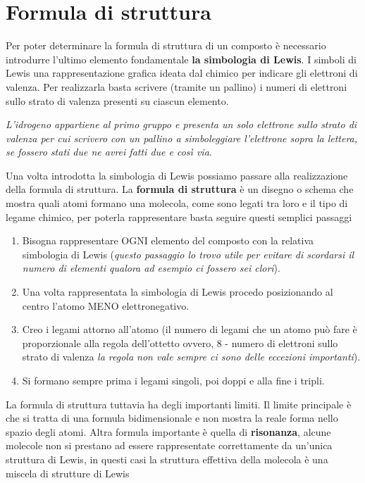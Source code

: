 \documentclass[11pt, a4paper, openright]{book}
\begin{document}
\section{Formula di struttura}
Per poter determinare la formula di struttura di un composto è necessario introdurre l'ultimo elemento fondamentale \textbf{la simbologia di Lewis}.
I simboli di Lewis una rappresentazione grafica ideata dal chimico per indicare gli elettroni di valenza. Per realizzarla basta scrivere (tramite un pallino) i numeri di elettroni sullo strato di valenza presenti su ciascun elemento. 
\begin{center}
\textit{L'idrogeno appartiene al primo gruppo e presenta un solo elettrone sullo strato di valenza per cui scrivero  con un pallino a simboleggiare l'elettrone sopra la lettera, se fossero stati due ne avrei fatti due e così via}.
\end{center}
Una volta introdotta la simbologia di Lewis possiamo passare alla realizzazione della formula di struttura.
La \textbf{formula di struttura} è un disegno o schema che mostra quali atomi formano una molecola, come sono legati tra loro e il tipo di legame chimico, per poterla rappresentare basta seguire questi semplici passaggi 
\begin{enumerate}
    \item Bisogna rappresentare OGNI elemento del composto con la relativa simbologia di Lewis (\textit{questo passaggio lo trovo utile per evitare di scordarsi il numero di elementi qualora ad esempio ci fossero sei clori}).
    \item Una volta rappresentata la simbologia di Lewis procedo posizionando al centro l'atomo MENO elettronegativo.
    \item Creo i legami attorno all'atomo (il numero di legami che un atomo può fare è proporzionale alla regola dell'ottetto ovvero, 8 - numero di elettroni sullo strato di valenza \textit{la regola non vale sempre ci sono delle eccezioni importanti}).
    \item Si formano sempre prima i legami singoli, poi doppi e alla fine i tripli.
\end{enumerate}
La formula di struttura tuttavia ha degli importanti limiti.
Il limite principale è che si tratta di una formula bidimensionale e non mostra la reale forma nello spazio degli atomi.
Altra formula importante è quella di \textbf{risonanza}, alcune molecole non si prestano ad essere rappresentate correttamente da un'unica struttura di Lewis, in questi casi la struttura effettiva della molecola è una miscela di strutture di Lewis
\end{document}
